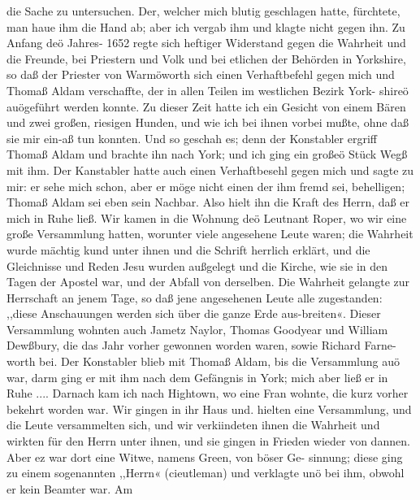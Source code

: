 die Sache zu untersuchen. Der, welcher mich blutig geschlagen
hatte, fürchtete, man haue ihm die Hand ab; aber ich vergab
ihm und klagte nicht gegen ihn.
Zu Anfang deö Jahres- 1652 regte sich heftiger Widerstand
gegen die Wahrheit und die Freunde, bei Priestern und Volk
und bei etlichen der Behörden in Yorkshire, so daß der Priester
von Warmöworth sich einen Verhaftbefehl gegen mich und Thomaß
Aldam verschaffte, der in allen Teilen im westlichen Bezirk York-
shireö auögeführt werden konnte. Zu dieser Zeit hatte ich ein
Gesicht von einem Bären und zwei großen, riesigen Hunden, und
wie ich bei ihnen vorbei mußte, ohne daß sie mir ein-aß tun
konnten. Und so geschah es; denn der Konstabler ergriff Thomaß
Aldam und brachte ihn nach York; und ich ging ein großeö Stück
Wegß mit ihm. Der Kanstabler hatte auch einen Verhaftbesehl
gegen mich und sagte zu mir: er sehe mich schon, aber er möge
nicht einen der ihm fremd sei, behelligen; Thomaß Aldam sei
eben sein Nachbar. Also hielt ihn die Kraft des Herrn, daß er
mich in Ruhe ließ. Wir kamen in die Wohnung deö Leutnant
Roper, wo wir eine große Versammlung hatten, worunter viele
angesehene Leute waren; die Wahrheit wurde mächtig kund
unter ihnen und die Schrift herrlich erklärt, und die Gleichnisse
und Reden Jesu wurden außgelegt und die Kirche, wie sie in den
Tagen der Apostel war, und der Abfall von derselben. Die
Wahrheit gelangte zur Herrschaft an jenem Tage, so daß jene
angesehenen Leute alle zugestanden: ,,diese Anschauungen werden
sich über die ganze Erde aus-breiten«. Dieser Versammlung
wohnten auch Jametz Naylor, Thomas Goodyear und William
Dewßbury, die das Jahr vorher gewonnen worden waren, sowie
Richard Farne-worth bei. Der Konstabler blieb mit Thomaß
Aldam, bis die Versammlung auö war, darm ging er mit ihm
nach dem Gefängnis in York; mich aber ließ er in Ruhe ....
Darnach kam ich nach Hightown, wo eine Fran wohnte, die
kurz vorher bekehrt worden war. Wir gingen in ihr Haus und.
hielten eine Versammlung, und die Leute versammelten sich, und
wir verkiindeten ihnen die Wahrheit und wirkten für den Herrn
unter ihnen, und sie gingen in Frieden wieder von dannen.
Aber ez war dort eine Witwe, namens Green, von böser Ge-
sinnung; diese ging zu einem sogenannten ,,Herrn« (cieutleman)
und verklagte unö bei ihm, obwohl er kein Beamter war. Am


